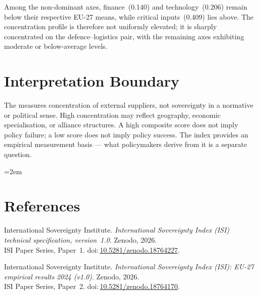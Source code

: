 \documentclass[12pt,a4paper]{article}
\begin{document}
Among the non-dominant axes, finance~(0.140) and technology~(0.206) remain below their respective EU-27 means, while critical inputs~(0.409) lies above.  The concentration profile is therefore not uniformly elevated; it is sharply concentrated on the defence--logistics pair, with the remaining axes exhibiting moderate or below-average levels.


\section{Interpretation Boundary}
\label{sec:interpretation}

The \ISI measures concentration of external suppliers, not sovereignty in a normative or political sense.  High concentration may reflect geography, economic specialisation, or alliance structures.  A high composite score does not imply policy failure; a low score does not imply policy success.  The index provides an empirical measurement basis --- what policymakers derive from it is a separate question.


\clearpage
\vspace*{1.5cm}

\begingroup\emergencystretch=2em
\section*{References}

\begin{enumerate}[label={[\arabic*]},leftmargin=2em,itemsep=6pt]
\item International Sovereignty Institute.
  \textit{International Sovereignty Index (ISI) technical specification, version~1.0}.
  Zenodo, 2026.\\ISI Paper Series, Paper~1.
  doi:\,\href{https://doi.org/10.5281/zenodo.18764227}{10.5281/zenodo.18764227}.

\item International Sovereignty Institute.
  \textit{International Sovereignty Index (ISI): EU-27 empirical results 2024 (v1.0)}.
  Zenodo, 2026.\\ISI Paper Series, Paper~2.
  doi:\,\href{https://doi.org/10.5281/zenodo.18764170}{10.5281/zenodo.18764170}.
\end{enumerate}
\endgroup
\end{document}
